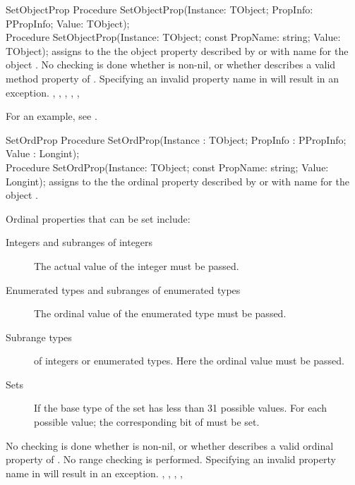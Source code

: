 \begin{procedure}{SetObjectProp}
\Declaration
Procedure SetObjectProp(Instance: TObject; 
                        PropInfo: PPropInfo; Value: TObject);\\
Procedure SetObjectProp(Instance: TObject; 
                        const PropName: string; Value: TObject);                        
\Description
{} assigns  to the the object property described by
 or with name  for the object . 
\Errors
No checking is done whether  is non-nil, or whether
 describes a valid method property of .
Specifying an invalid property name in  will result in an
 exception.
\SeeAlso
{}, , ,
, , 
\end{procedure}

For an example, see .

\begin{procedure}{SetOrdProp}
\Declaration
Procedure SetOrdProp(Instance : TObject; PropInfo : PPropInfo; 
                     Value : Longint);\\
Procedure SetOrdProp(Instance: TObject; const PropName: string;
                     Value: Longint);
\Description
{} assigns  to the the ordinal property described by 
 or with name  for the object . 

Ordinal properties that can be set include:
\begin{description}
\item[Integers and subranges of integers] The actual value of the integer must be 
passed.
\item[Enumerated types and subranges of enumerated types] The ordinal value
of the enumerated type must be passed.
\item[Subrange types] of integers or enumerated types. Here the ordinal
value must be passed.
\item[Sets] If the base type of the set has less than 31 possible values.
For each possible value; the corresponding bit of  must be set.
\end{description}
\Errors
No checking is done whether  is non-nil, or whether
 describes a valid ordinal property of . 
No range checking is performed.
Specifying an invalid property name in  will result in an
 exception.
\SeeAlso
{}, , ,
,
\end{procedure}


